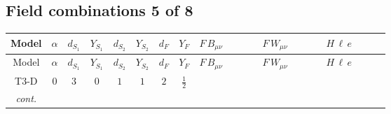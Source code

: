 \documentclass[8pt]{article}
\begin{document}
\begin{landscape}
\subsection*{Field combinations 5 of 8}
\begin{longtable}{@{}cccccccc >{\raggedright\arraybackslash}p{0.21\linewidth} >{\raggedright\arraybackslash}p{0.21\linewidth} >{\raggedright\arraybackslash}p{0.21\linewidth}@{}}
\toprule
Model & $\alpha$ & $d_{S_1}$ & $Y_{S_1}$ & $d_{S_2}$ & $Y_{S_2}$ & $d_F$ & $Y_F$ & $F\,B_{\mu\nu}$ & $F\,W_{\mu\nu}$ & $H\,\ell\,e$ \\
\midrule
\endfirsthead
\toprule
Model & $\alpha$ & $d_{S_1}$ & $Y_{S_1}$ & $d_{S_2}$ & $Y_{S_2}$ & $d_F$ & $Y_F$ & $F\,B_{\mu\nu}$ & $F\,W_{\mu\nu}$ & $H\,\ell\,e$ \\
\midrule
\endhead
T3-D & $0$ & $3$ & $0$ & $1$ & $1$ & $2$ & $\frac{1}{2}$ & \scriptsize\adjustbox{max width=\linewidth}{$\begin{gathered} -\frac{1}{2} \hbar  \log \left(\frac{\bar{\mu}^{2}}{M_F^2}\right) B_{\mu _1\mu _2}^2\end{gathered}$} & \scriptsize\adjustbox{max width=\linewidth}{$\begin{gathered} -\frac{1}{2} \hbar  \log \left(\frac{\bar{\mu}^{2}}{M_F^2}\right) \left(W_{\mu _1\mu _2}^{A_1}\right){}^2\end{gathered}$} & \scriptsize\adjustbox{max width=\linewidth}{$\begin{gathered} +\frac{\sqrt{3} \hbar  \overline{y_{1,i_3,r_1}} \overline{L_{a_1,i_2}}\, P_R\, e_{i_1} H_{a_1} y_{1,i_2,r_1} Y_{e,i_3,i_1}}{4 \epsilon } \\ +\frac{3}{8} \sqrt{3} \hbar  \overline{y_{1,i_3,r_1}} \overline{L_{a_1,i_2}}\, P_R\, e_{i_1} H_{a_1} y_{1,i_2,r_1} Y_{e,i_3,i_1} \\ +\frac{\hbar  \overline{y_{2,i_3,r_1}} \overline{L_{a_1,i_2}}\, P_R\, e_{i_1} H_{a_1} y_{2,i_2,r_1} Y_{e,i_3,i_1}}{4 \epsilon }\end{gathered}$} \\
\textit{cont.} &  &  &  &  &  &  &  &  &  & \scriptsize\adjustbox{max width=\linewidth}{$\begin{gathered} +\frac{3}{8} \hbar  \overline{y_{2,i_3,r_1}} \overline{L_{a_1,i_2}}\, P_R\, e_{i_1} H_{a_1} y_{2,i_2,r_1} Y_{e,i_3,i_1} \\ +\frac{\sqrt{3} \hbar  \overline{y_{1,i_1,r_1}} \overline{Y_{e,i_3,i_2}} \overline{e_{i_2}}\, P_L\, L_{a_1,i_1} y_{1,i_3,r_1} H_{a_1}{}^{\dagger }}{4 \epsilon } \\ +\frac{3}{8} \sqrt{3} \hbar  \overline{y_{1,i_1,r_1}} \overline{Y_{e,i_3,i_2}} \overline{e_{i_2}}\, P_L\, L_{a_1,i_1} y_{1,i_3,r_1} H_{a_1}{}^{\dagger }\end{gathered}$} \\

\end{longtable}
\end{landscape}
\end{document}
